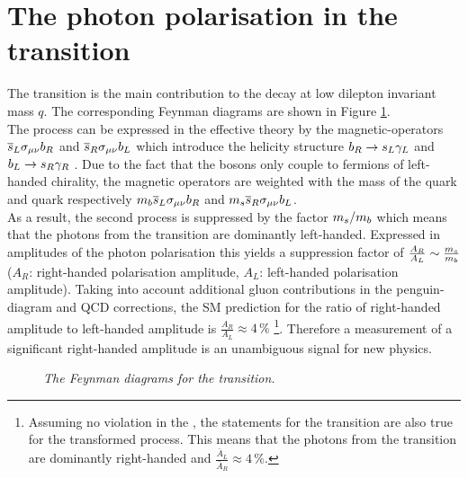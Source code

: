 \section{The photon polarisation in the \bsg transition}
The \bsg transition is the main contribution to the \BdKstll decay at low dilepton invariant mass $q$. The corresponding Feynman diagrams are shown in Figure \ref{fig:bsg}.\\  
The process can be expressed in the effective theory by the magnetic-operators $\overline {s}_L \sigma_{\mu \nu} b_R$ and $\overline {s}_R \sigma_{\mu \nu} b_L$ which introduce the helicity structure $b_R \rightarrow s_L \gamma_L $ and \\$b_L \rightarrow s_R \gamma_R $ \cite{emi}. Due to the fact that the \W bosons only couple to fermions of left-handed chirality, the magnetic operators are weighted with the mass of the \bquark quark and \squark quark respectively $m_{b} \overline {s}_L \sigma_{\mu \nu} b_R$ and $m_{s} \overline {s}_R \sigma_{\mu \nu} b_L$.\\
As a result, the second process is suppressed by the factor $m_{s} / m_{b}$ which means that the photons from the \bsg transition are dominantly left-handed. Expressed in amplitudes of the photon polarisation this yields a suppression factor of $ \frac{A_R}{A_L} \sim \frac{m_{s } }{ m_{b } } $ ($A_R$: right-handed polarisation amplitude, $A_L$: left-handed polarisation amplitude). Taking into account additional gluon contributions in the penguin-diagram and QCD corrections, the SM prediction for the ratio of right-handed amplitude to left-handed amplitude is $\frac{A_R}{A_L} \approx 4 \,\% $  \footnote{Assuming no \CP violation in the \bsg, the statements for the \bsg transition are also true for the \CP transformed process. This means that the photons from the \absg transition are dominantly right-handed and $ \frac{ \bar{A} _L}{ \bar{A} _R} \approx 4 \,\% $.}\cite{ananote}. Therefore a measurement of a significant right-handed amplitude is an unambiguous signal for new physics.\\
\begin{figure}[ht]
  \begin{center}
  \vspace*{-0.5cm}
  \end{center}
  \caption{\textit{The Feynman diagrams for the \bsg transition.}}
  \label{fig:bsg}
\end{figure}
\newpage
